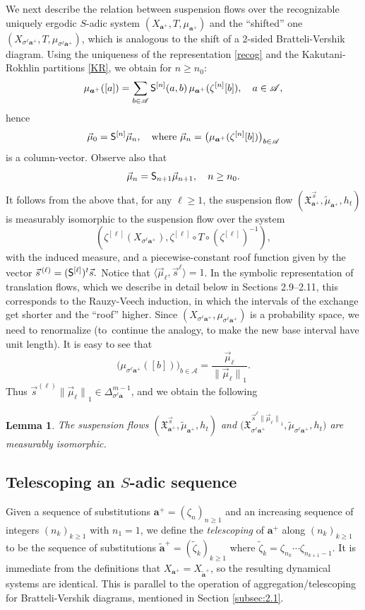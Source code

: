 \documentclass[11pt]{article}
\numberwithin{equation}{section}\newcommand{\Relation}[2][]{}\newtheorem*{prop*}{Proposition}
\let\mathcal\mathscr
\theoremstyle{plain}
\newtheorem{lemma}[theorem]{Lemma}
\theoremstyle{definition}
\let\wt\widetilde
\newcommand\bom{{\boldsymbol a}}\let\ba\bom
\let\sig\sigma
\newcommand\Xx{\mathfrak{X}}
\newcommand\Ak{\mathcal{A}}
\newcommand\Sf{{\sf S}}
\newcommand\be{\begin{equation}}
\newcommand\ee{\end{equation}}
\begin{document}
We next describe the relation between suspension flows over the recognizable uniquely ergodic $S$-adic system $(X_{\bom^+},T, \mu_{\bom^+})$ and the ``shifted'' one $(X_{\sig^\ell\bom^+}, T, \mu_{\sig^\ell\bom^+})$, which is analogous to the shift of a 2-sided Bratteli-Vershik diagram.
Using the uniqueness of the representation \eqref{recog} and the Kakutani-Rokhlin partitions \eqref{KR}, we obtain for $n\ge n_0$:
\[
\mu_{\bom^+}([a]) = \sum_{b\in \Ak}\Sf^{[n]}(a,b)\,\mu_{\bom^+}(\zeta^{[n]}[b]),\quad a\in \Ak,
\]
hence
\be \label{eq-measure}
\vec{\mu}_0 = \Sf^{[n]}\vec{\mu}_n,\quad \text{where } \vec{\mu}_n = \bigl(\mu_{\bom^+}(\zeta^{[n]}[b])\bigr)_{b\in \Ak}
\ee
is a column-vector. Observe also that
\be \label{eq-measure2}
\vec{\mu}_n = \Sf_{n+1}\vec{\mu}_{n+1},\quad n\ge n_0.
\ee
It follows from the above that, for any $\ell\ge 1$, the suspension flow $(\Xx_{\ba^+}^{\vec{s}},\wt\mu_{\bom^+},h_t)$ is measurably isomorphic to the suspension flow over the system
\[
(\zeta^{[\ell]}(X_{\sig^\ell\ba^+}), \zeta^{[\ell]}\circ T\circ (\zeta^{[\ell]})^{-1}),
\]
with the induced measure, and a piecewise-constant roof function given by the vector
$
\vec{s}^{\,(\ell)}= (\Sf^{[\ell]})^t \vec{s}.
$
Notice that $\langle \vec\mu_\ell, \vec s^{\ell}\rangle=1$. In the symbolic representation of translation flows, which we describe in detail below in Sections 2.9--2.11, this corresponds to the Rauzy-Veech induction, in which the intervals of the exchange get shorter and the ``roof'' higher. Since $(X_{\sig^\ell\bom^+}, \mu_{\sig^\ell\bom^+})$ is a probability space, we need to renormalize
(to~continue the analogy, to make the new base interval have unit length).
It is easy to see that
\[
\bigl(\mu_{\sig^\ell \bom^+}([b])\bigr)_{b\in \Ak} = \frac{\vec\mu_\ell}{{\|\vec \mu_\ell\|}_1}.
\]
Thus $\vec s^{(\ell)}{\|\vec \mu_\ell\|}_1\in \Delta^{m-1}_{\sig^\ell\bom}$, and we obtain the following
\begin{lemma} \label{lem-shift}
The suspension flows $(\Xx_{\ba^+}^{\vec{s}},\wt{\mu}_{\bom^+},h_t)$ and $\bigl(\Xx_{\sig^\ell\ba^+}^{\vec{s}^{\ell}{\|\vec \mu_\ell\|}_1},\wt{\mu}_{\sig^\ell\bom^+},h_t\bigr)$ are measurably isomorphic.
\end{lemma}

\subsection{Telescoping an $S$-adic sequence \cite[5.2]{BSTY}}
Given a sequence of substitutions $\ba^+ = (\zeta_n)_{n\ge 1}$ and an increasing sequence of integers $(n_k)_{k\ge 1}$ with $n_1=1$, we define the \emph{telescoping} of $\ba^+$ along $(n_k)_{k\ge 1}$
to be the sequence of substitutions $\wt\ba^+ = (\wt \zeta_k)_{k\ge 1}$ where $\wt\zeta_k = \zeta_{n_k}\cdots \zeta_{n_{k+1}-1}$. It is immediate from the definitions that $X_{\ba^+}=X_{\wt\ba^+}$, so the
resulting dynamical systems are identical. This is parallel to the operation of aggregation/telescoping for Bratteli-Vershik diagrams, mentioned in Section \ref{subsec:2.1}.
\end{document}
